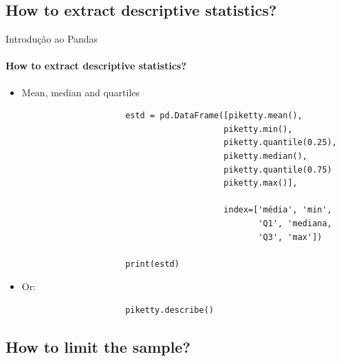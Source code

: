 \documentclass[notes,11pt, aspectratio=169, xcolor=table]{beamer}
\begin{document}
        \subsection{How to extract descriptive statistics?}

        \begin{frame}[fragile=singleslide]{Introdução ao Pandas}
        \framesubtitle{How to extract descriptive statistics?}
            
             \begin{itemize}
    
                \item Mean, median and quartiles
                
                    \begin{verbatim}
                     estd = pd.DataFrame([piketty.mean(),
                                         piketty.min(),
                                         piketty.quantile(0.25),
                                         piketty.median(),
                                         piketty.quantile(0.75)
                                         piketty.max()],
                                         
                                         index=['média', 'min',
                                                'Q1', 'mediana,
                                                'Q3', 'max'])
                     
                     print(estd)
                    \end{verbatim}
                
                \item Or:
                
                
                    \begin{verbatim}
                     piketty.describe()
                    \end{verbatim}
                
                    
            \end{itemize}             

    \end{frame}        

        \subsection{How to limit the sample?}
        
\end{document}
